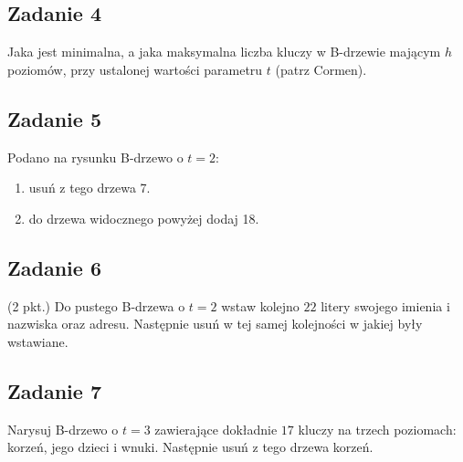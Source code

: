 \documentclass{article}
\begin{document}
\subsection*{Zadanie 4}
Jaka jest minimalna, a jaka maksymalna liczba kluczy w B-drzewie mającym $h$ poziomów, przy ustalonej wartości
parametru $t$ (patrz Cormen).

\subsection*{Zadanie 5}
Podano na rysunku B-drzewo o $t=2$:
\begin{center}
    \begin{enumerate}[label=-]
        \item usuń z tego drzewa 7.
        \item do drzewa widocznego powyżej dodaj 18.
    \end{enumerate}
\end{center}

\subsection*{Zadanie 6}
(2 pkt.) Do pustego B-drzewa o $t=2$ wstaw kolejno $22$ litery swojego imienia i nazwiska oraz adresu. Następnie usuń w
tej samej kolejności w jakiej były wstawiane.

\subsection*{Zadanie 7}
Narysuj B-drzewo o $t=3$ zawierające dokładnie $17$ kluczy na trzech poziomach: korzeń, jego dzieci i wnuki. Następnie
usuń z tego drzewa korzeń.
\end{document}
